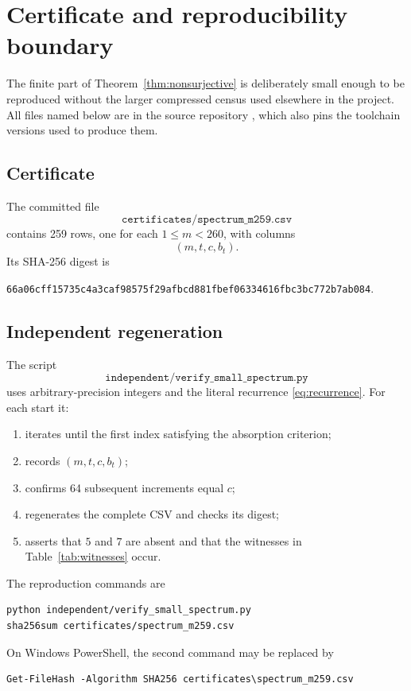 \section{Certificate and reproducibility boundary}

The finite part of Theorem~\ref{thm:nonsurjective} is deliberately small enough to be reproduced without the larger compressed census used elsewhere in the project. All files named below are in the source repository \cite{repository}, which also pins the toolchain versions used to produce them.

\subsection*{Certificate}
The committed file
\[
 \texttt{certificates/spectrum\_m259.csv}
\]
contains 259 rows, one for each $1\le m<260$, with columns
\[
 (m,t,c,b_t).
\]
Its SHA-256 digest is
\begin{center}
\small\texttt{66a06cff15735c4a3caf98575f29afbcd881fbef06334616fbc3bc772b7ab084}.
\end{center}

\subsection*{Independent regeneration}
The script
\[
 \texttt{independent/verify\_small\_spectrum.py}
\]
uses arbitrary-precision integers and the literal recurrence \eqref{eq:recurrence}. For each start it:
\begin{enumerate}
\item iterates until the first index satisfying the absorption criterion;
\item records $(m,t,c,b_t)$;
\item confirms 64 subsequent increments equal $c$;
\item regenerates the complete CSV and checks its digest;
\item asserts that $5$ and $7$ are absent and that the witnesses in Table~\ref{tab:witnesses} occur.
\end{enumerate}

The reproduction commands are
\begin{verbatim}
python independent/verify_small_spectrum.py
sha256sum certificates/spectrum_m259.csv
\end{verbatim}
On Windows PowerShell, the second command may be replaced by
\begin{verbatim}
Get-FileHash -Algorithm SHA256 certificates\spectrum_m259.csv
\end{verbatim}

